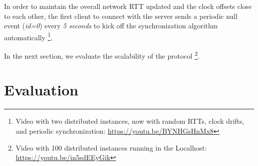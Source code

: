 \documentclass[sigplan,screen]{acmart}
\begin{document}
In order to maintain the overall network RTT updated and the clock offsets
close to each other, the first client to connect with the server sends a
periodic null event (\emph{id=0}) every \emph{5 seconds} to kick off the
synchronization algorithm automatically%
\footnote {
    Video with two distributed instances, now with random RTTs, clock drifts,
    and periodic synchronization:
    \url{https://youtu.be/BYNHGsHnMx8}
}.

In the next section, we evaluate the scalability of the protocol%
\footnote {
    Video with 100 distributed instances running in the Localhost:
    \url{https://youtu.be/in5sdEEyGik}
}.

\section{Evaluation}
\label{sec.eval}
\end{document}
